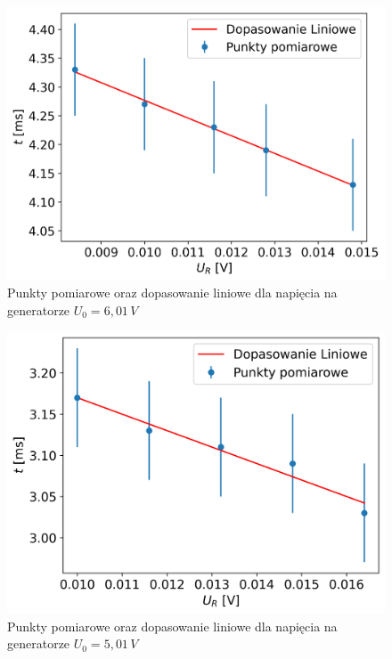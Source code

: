 \documentclass[12pt]{article}
\begin{document}
\begin{figure}[H]
    \centering
    \includegraphics[scale=0.58]{nachylenie_5}
    \caption{Punkty pomiarowe oraz dopasowanie liniowe dla napięcia na generatorze $U_0 = 6{,}01 \, V$}
\end{figure}
\begin{figure}[H]
    \centering
    \includegraphics[scale=0.58]{nachylenie_6}
    \caption{Punkty pomiarowe oraz dopasowanie liniowe dla napięcia na generatorze $U_0 = 5{,}01 \, V$}
\end{figure}
\end{document}
